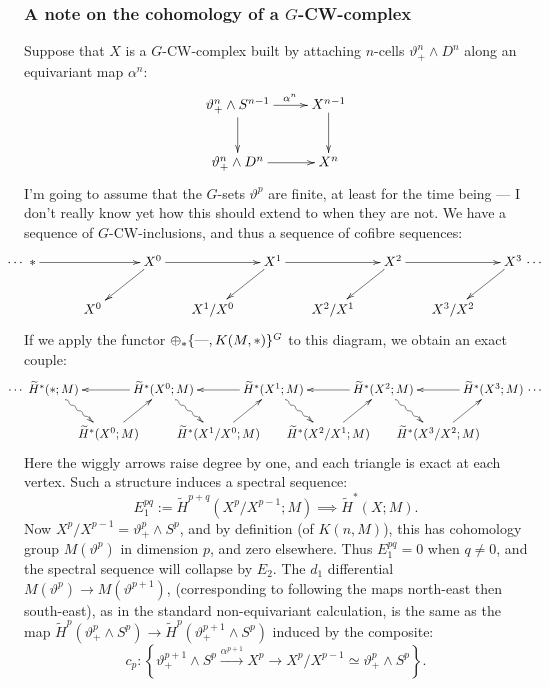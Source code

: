 \documentclass[11pt]{article}
\begin{document}
\subsubsection*{A note on the cohomology of a $G$-CW-complex}
Suppose that $X$ is a $G$-CW-complex built by attaching $n$-cells $\vartheta^n_+\wedge D^n$ along an equivariant map $\alpha^n$:
\[\xymatrix{
\vartheta^n_+\wedge S^{n-1}\ar[d]\ar[r]^{\quad\alpha^n}&X^{n-1}\ar[d]\\
\vartheta^n_+\wedge D^{n}\ar[r]&X^{n}
}\]
I'm going to assume that the $G$-sets $\vartheta^p$ are finite, at least for the time being --- I don't really know yet how this should extend to when they are not.
We have a sequence of $G$-CW-inclusions, and thus a sequence of cofibre sequences:
\[\xymatrix@!0@C=1.6cm@R=1.28cm{%
\makebox[0cm][r]{$\cdots$\
}\ast\ar[rr]&&X^0\ar[rr]\ar[ld]&&X^1\ar[rr]
\ar[ld]&&X^2\ar[ld]
\ar[rr]&&X^3\makebox[0cm][l]{\ $\cdots$}\ar[ld]\\
&X^0&&%
X^1/X^0&&%
X^2/X^1&&%
X^3/X^2%
}\]
If we apply the functor $\oplus_{*}\{\textup{---},K(M,*)\}^G$ to this diagram, we obtain an exact couple:
\[\xymatrix@!0@C=1.6cm@R=1.28cm{%
\makebox[0cm][r]{$\cdots$\
}\widetilde H^*(\ast;M)\ar[rr];[]&&\widetilde H^*(X^0;M)\ar[rr];[]\ar[ld];[]&&\widetilde H^*(X^1;M)\ar[rr];[]
\ar[ld];[]&&\widetilde H^*(X^2;M)\ar[ld];[]
\ar[rr];[]&&\widetilde H^*(X^3;M)\makebox[0cm][l]{\ $\cdots$}\ar[ld];[]\\
&\widetilde H^*(X^0;M)\ar@{~>}[ul];[]&&
\widetilde H^*(X^1/X^0;M)\ar@{~>}[lu];[]&&
\widetilde H^*(X^2/X^1;M)\ar@{~>}[lu];[]&&
\widetilde H^*(X^3/X^2;M)\ar@{~>}[lu];[]
}\]
Here the wiggly arrows raise degree by one, and each triangle is exact at each vertex. Such a structure induces a spectral sequence:
\[E_1^{pq}:=\widetilde H^{p+q}(X^p/X^{p-1};M)\implies\widetilde H^*(X;M).\]
Now $X^p/X^{p-1}=\vartheta^p_+\wedge S^p$, and by definition (of $K(n,M)$), this has cohomology group $M(\vartheta^p)$ in dimension $p$, and zero elsewhere. Thus $E_1^{pq}=0$ when $q\neq0$, and the spectral sequence will collapse by $E_2$. The $d_1$ differential $M(\vartheta^p)\to M(\vartheta^{p+1})$, (corresponding to following the maps north-east then south-east), as in the standard non-equivariant calculation, is the same as the map $\widetilde H^p(\vartheta^{p}_+\wedge S^{p})\to\widetilde H^p(\vartheta^{p+1}_+\wedge S^{p})$ induced by the composite:
\[c_p:\left\{\vartheta_+^{p+1}\wedge S^p\overset{\alpha^{p+1}}{\to} X^p\to X^p/X^{p-1}\simeq\vartheta_+^{p}\wedge S^p\right\}.\]
\end{document}

